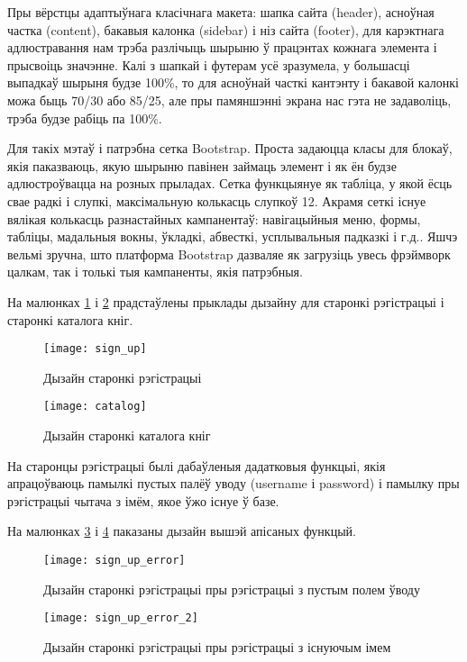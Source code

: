 Пры вёрстцы адаптыўнага класічнага макета: шапка сайта (header), асноўная частка (content), бакавыя калонка (sidebar) і ніз сайта (footer), для карэктнага адлюстравання нам трэба разлічыць шырыню ў працэнтах кожнага элемента і прысвоіць значэнне. Калі з шапкай і футерам усё зразумела, у большасці выпадкаў шырыня будзе 100\%, то для асноўнай часткі кантэнту і бакавой калонкі можа быць 70/30 або 85/25, але пры памяншэнні экрана нас гэта не задаволіць, трэба будзе рабіць па 100\%.

Для такіх мэтаў і патрэбна сетка Bootstrap. Проста задаюцца класы для блокаў, якія паказваюць, якую шырыню павінен займаць элемент і як ён будзе адлюстроўвацца на розных прыладах. Сетка функцыянуе як табліца, у якой ёсць свае радкі і слупкі, максімальную колькасць слупкоў 12.
Акрамя сеткі існуе вялікая колькасць разнастайных кампанентаў: навігацыйныя меню, формы, табліцы, мадальныя вокны, ўкладкі, абвесткі, усплывальныя падказкі і г.д..
Яшчэ вельмі зручна, што платформа Bootstrap дазваляе як загрузіць увесь фрэймворк цалкам, так і толькі тыя кампаненты, якія патрэбныя.

На малюнках \ref{img: sign up sample} і \ref{img: catalog sample} прадстаўлены прыклады дызайну для старонкі
рэгістрацыі і старонкі каталога кніг.

\begin{figure}[h!]
    \centering
    \texttt{[image: sign\_up]}
    \caption{Дызайн старонкі рэгістрацыі}
    \label{img: sign up sample} 
\end{figure}

\begin{figure}[h!]
    \centering
    \texttt{[image: catalog]}
    \caption{Дызайн старонкі каталога кніг}
    \label{img: catalog sample} 
\end{figure}

На старонцы рэгістрацыі былі дабаўленыя дадатковыя функцыі, якія апрацоўваюць памылкі пустых палёў уводу
(username і password) і памылку пры рэгістрацыі чытача з імём, якое ўжо існуе ў базе.

На малюнках \ref{img: sign up error} і \ref{img: sign up error 2} паказаны дызайн вышэй апісаных функцый.

\begin{figure}[h!]
    \centering
    \texttt{[image: sign\_up\_error]}
    \caption{Дызайн старонкі рэгістрацыі пры рэгістрацыі з пустым полем ўводу}
    \label{img: sign up error} 
\end{figure}

\begin{figure}[h!]
    \centering
    \texttt{[image: sign\_up\_error\_2]}
    \caption{Дызайн старонкі рэгістрацыі пры рэгістрацыі з існуючым імем}
    \label{img: sign up error 2} 
\end{figure}
